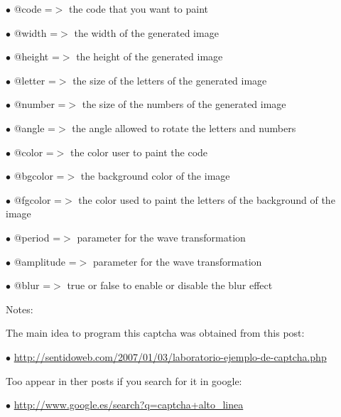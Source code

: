 \documentclass[a4paper]{book}
\def\htmladdnormallink#1#2{\href{#2}{#1}}
\begin{document}
\begin{compactitem}
\item[\color{myblue}$\bullet$] @code      =$>$ the code that you want to paint
\item[\color{myblue}$\bullet$] @width     =$>$ the width of the generated image
\item[\color{myblue}$\bullet$] @height    =$>$ the height of the generated image
\item[\color{myblue}$\bullet$] @letter    =$>$ the size of the letters of the generated image
\item[\color{myblue}$\bullet$] @number    =$>$ the size of the numbers of the generated image
\item[\color{myblue}$\bullet$] @angle     =$>$ the angle allowed to rotate the letters and numbers
\item[\color{myblue}$\bullet$] @color     =$>$ the color user to paint the code
\item[\color{myblue}$\bullet$] @bgcolor   =$>$ the background color of the image
\item[\color{myblue}$\bullet$] @fgcolor   =$>$ the color used to paint the letters of the background of the image
\item[\color{myblue}$\bullet$] @period    =$>$ parameter for the wave transformation
\item[\color{myblue}$\bullet$] @amplitude =$>$ parameter for the wave transformation
\item[\color{myblue}$\bullet$] @blur      =$>$ true or false to enable or disable the blur effect
\end{compactitem}

Notes:

The main idea to program this captcha was obtained from this post:

\begin{compactitem}
\item[\color{myblue}$\bullet$] \htmladdnormallink{http://sentidoweb.com/2007/01/03/laboratorio-ejemplo-de-captcha.php}{http://sentidoweb.com/2007/01/03/laboratorio-ejemplo-de-captcha.php}
\end{compactitem}

Too appear in ther posts if you search for it in google:

\begin{compactitem}
\item[\color{myblue}$\bullet$] \htmladdnormallink{http://www.google.es/search?q=captcha+alto\_linea}{http://www.google.es/search?q=captcha+alto\_linea}
\end{compactitem}
\end{document}

